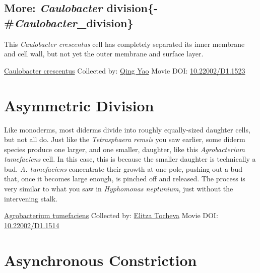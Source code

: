 \documentclass[]{tufte-book}
\begin{document}
\hypertarget{more-caulobacter-division-caulobacter_division}{%
\subsection{\texorpdfstring{More: \emph{Caulobacter} division\{-\#\emph{Caulobacter}\_division\}}{More: Caulobacter division\{-\#Caulobacter\_division\}}}\label{more-caulobacter-division-caulobacter_division}}

This \emph{Caulobacter crescentus} cell has completely separated its inner membrane and cell wall, but not yet the outer membrane and surface layer.



\hypertarget{htmlwidget-65b8ef30c55edcef7ac7}{}

\label{fig:5-7a}\protect\hyperlink{tree}{Caulobacter crescentus} Collected by: \protect\hyperlink{qing_yao}{Qing Yao} Movie DOI: \href{https://doi.org/10.22002/D1.1523}{10.22002/D1.1523}

\hypertarget{asymmetric-division}{%
\section{Asymmetric Division}\label{asymmetric-division}}

Like monoderms, most diderms divide into roughly equally-sized daughter cells, but not all do. Just like the \emph{Tetrasphaera remsis} you saw earlier, some diderm species produce one larger, and one smaller, daughter, like this \emph{Agrobacterium tumefaciens} cell. In this case, this is because the smaller daughter is technically a bud. \emph{A. tumefaciens} concentrate their growth at one pole, pushing out a bud that, once it becomes large enough, is pinched off and released. The process is very similar to what you saw in \emph{Hyphomonas neptunium}, just without the intervening stalk.



\hypertarget{htmlwidget-b0224a444440eef972fb}{}

\label{fig:5-8}\protect\hyperlink{tree}{Agrobacterium tumefaciens} Collected by: \protect\hyperlink{elitza_tocheva}{Elitza Tocheva} Movie DOI: \href{https://doi.org/10.22002/D1.1514}{10.22002/D1.1514}

\hypertarget{asynchronous-constriction}{%
\section{Asynchronous Constriction}\label{asynchronous-constriction}}
\end{document}
